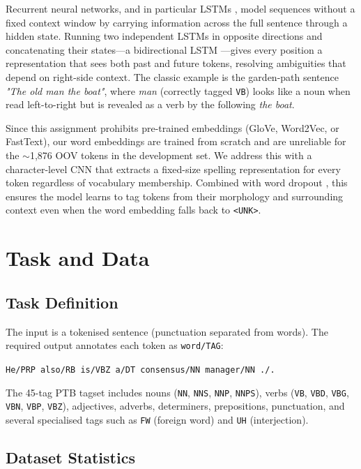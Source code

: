 \documentclass[11pt]{article}
\begin{document}
Recurrent neural networks, and in particular LSTMs
\cite{hochreiter1997long,graves2005framewise}, model sequences without a fixed
context window by carrying information across the full sentence through a
hidden state.  Running two independent LSTMs in opposite directions and
concatenating their states---a bidirectional LSTM
\cite{graves2005framewise}---gives every position a representation that sees
both past and future tokens, resolving ambiguities that depend on right-side
context.  The classic example is the garden-path sentence \textit{"The old man
the boat"}, where \textit{man} (correctly tagged \texttt{VB}) looks like a
noun when read left-to-right but is revealed as a verb by the following
\textit{the boat}.

Since this assignment prohibits pre-trained embeddings (GloVe, Word2Vec, or
FastText), our word embeddings are trained from scratch and are unreliable for
the $\sim$1,876 OOV tokens in the development set.  We address this with a
character-level CNN \cite{ma-hovy-2016-end,chiu-nichols-2016-named} that
extracts a fixed-size spelling representation for every token regardless of
vocabulary membership.  Combined with word dropout
\cite{kiperwasser-goldberg-2016-simple}, this ensures the model learns to tag
tokens from their morphology and surrounding context even when the word
embedding falls back to \texttt{<UNK>}.

\section{Task and Data}

\subsection{Task Definition}

The input is a tokenised sentence (punctuation separated from words).  The
required output annotates each token as \texttt{word/TAG}:
\begin{center}
\texttt{He/PRP also/RB is/VBZ a/DT consensus/NN manager/NN ./.}
\end{center}
The 45-tag PTB tagset includes nouns (\texttt{NN}, \texttt{NNS},
\texttt{NNP}, \texttt{NNPS}), verbs (\texttt{VB}, \texttt{VBD}, \texttt{VBG},
\texttt{VBN}, \texttt{VBP}, \texttt{VBZ}), adjectives, adverbs,
determiners, prepositions, punctuation, and several specialised tags such
as \texttt{FW} (foreign word) and \texttt{UH} (interjection).

\subsection{Dataset Statistics}
\end{document}
